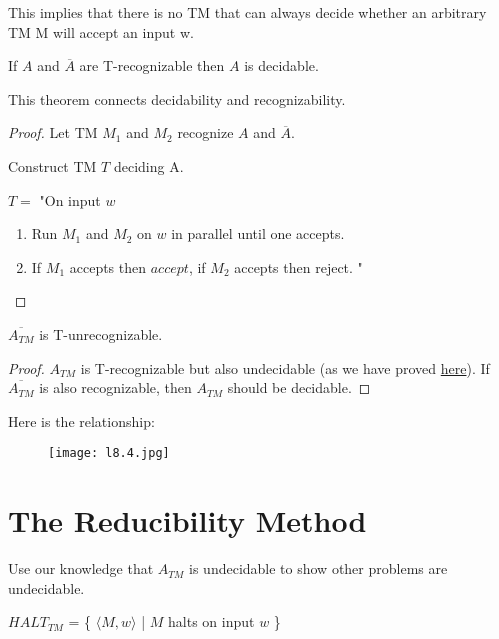 This implies that there is no TM that can always decide whether an arbitrary TM M  will accept an input w. 

\begin{theorem}
    If \(A\)  and \(\overline{A}\) are T-recognizable then \(A\) is decidable. 
\end{theorem}

This theorem connects decidability and recognizability.

\begin{proof}
    Let TM \(M_1\) and \(M_2\) recognize \(A\) and \(\overline{A}\).     

    Construct TM \(T\) deciding A. 

    \(T = \) "On input \(w\)
    \begin{enumerate}
        \item Run \(M_1\) and \(M_2\) on \(w\) in parallel until one accepts.
        \item If \(M_1\) accepts then \(accept\), if \(M_2\) accepts then reject. "
    \end{enumerate}  
\end{proof}

\begin{corollary}
    \(\overline{A_{TM}}\) is T-unrecognizable. 
\end{corollary}
\begin{proof}
    \(A_{TM}\) is T-recognizable but also undecidable (as we have proved \hyperref[theorem: undecidable language]{here}). 
    If \(\overline{A_{TM}}\) is also recognizable, then \(A_{TM}\) should be decidable.  
\end{proof}

Here is the relationship:
    \begin{figure}[H]
    \centering
    \texttt{[image: l8.4.jpg]}
    \caption{}
    \end{figure}

\section{The Reducibility Method}

Use our knowledge that \(A_{TM}\) is undecidable to show other problems are undecidable. 

\begin{definition}
    \(HALT_{TM}\) = \{ \( \langle M, w \rangle\) | \(M\) halts on input \(w\) \}  
\end{definition}

